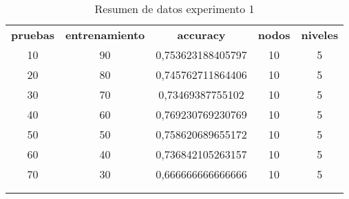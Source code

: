 	\begin{table}[]
		\centering
		\label{tabla-exp-1}
		\begin{tabular}{ccccc}
			\textbf{pruebas}     & \textbf{entrenamiento} & \textbf{accuracy}    & \textbf{nodos}       & \textbf{niveles}     \\
			10                   & 90                     & 0,753623188405797    & 10                   & 5                    \\
			20                   & 80                     & 0,745762711864406    & 10                   & 5                    \\
			30                   & 70                     & 0,73469387755102     & 10                   & 5                    \\
			40                   & 60                     & 0,769230769230769    & 10                   & 5                    \\
			50                   & 50                     & 0,758620689655172    & 10                   & 5                    \\
			60                   & 40                     & 0,736842105263157    & 10                   & 5                    \\
			70                   & 30                     & 0,666666666666666    & 10                   & 5                    \\
			&                        &                      &                      &                      \\
			\multicolumn{1}{l}{} & \multicolumn{1}{l}{}   & \multicolumn{1}{l}{} & \multicolumn{1}{l}{} & \multicolumn{1}{l}{}
		\end{tabular}
		\caption{ Resumen de datos experimento 1}
	\end{table}






	\begin{table}[] 	\label{tabl-exp-1-frec}
		\centering
		\caption{Tabla de frecuencia experimento 1}
	\end{table}



